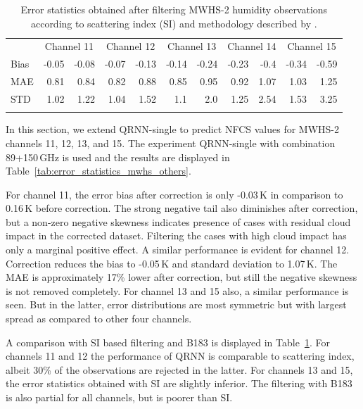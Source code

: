 \documentclass[amt, manuscript]{copernicus}
\begin{document}
\begin{table}[t]
	\caption{Error statistics obtained after filtering MWHS-2 humidity observations according to scattering index (SI) and methodology described by \citet{buehler:aclou:07}.}
	\label{tab:SI_statistics}
	\begin{tabular}{lrr|rr|rr|rr|rr}
		\tophline
		& \multicolumn{2}{c|}{Channel 11} & \multicolumn{2}{c|}{Channel 12} & \multicolumn{2}{c|}{Channel 13} & \multicolumn{2}{c|}{Channel 14} & \multicolumn{2}{c}{Channel 15}\\
			\cline{2-11}
		Bias &-0.05	&-0.08	&-0.07&	-0.13&-0.14	&-0.24	&-0.23&	-0.4&-0.34&	-0.59\\
		MAE   & 0.81	&0.84	&0.82 &	0.88 &	0.85&0.95   &0.92 &	1.07&1.03 &	1.25\\
		STD   &1.02	&1.22	&1.04 &	1.52 &	1.1	& 2.0	&1.25 &	2.54&1.53&	3.25\\
		\bottomhline		
	\end{tabular}
\end{table}

In this section, we extend QRNN-single to predict NFCS values for MWHS-2 channels 11, 12, 13, and 15. The experiment QRNN-single with combination 89+150\,GHz is used and the results are displayed in Table~\ref{tab:error_statistics_mwhs_others}.

For channel 11, the error bias after correction is only -0.03\,K in comparison to 0.16\,K before correction. The strong negative tail also diminishes after correction, but a non-zero negative skewness indicates presence of cases with residual cloud impact in the corrected dataset. Filtering the cases with high cloud impact has only a marginal positive effect. A similar performance is evident for channel 12. Correction reduces the bias to -0.05\,K and standard deviation to 1.07\,K. The MAE is approximately 17\% lower after correction, but still the negative skewness is not removed completely. For channel 13 and 15 also, a similar performance is seen. But in the latter, error distributions are most symmetric but with largest spread as compared to other four channels.

A comparison with SI based filtering and B183 is displayed in  Table~\ref{tab:SI_statistics}. For channels 11 and 12 the performance of QRNN is comparable to scattering index, albeit 30\% of the observations are rejected in the latter. For channels 13 and 15, the error statistics obtained with SI are slightly inferior. The filtering with B183 is also partial for all channels, but is poorer than SI. 
\end{document}
